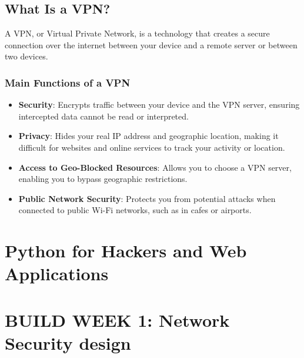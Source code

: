 \subsection{What Is a VPN?}

A VPN, or Virtual Private Network, is a technology that creates a secure connection over the internet between your device and a remote server or between two devices.

\subsubsection{Main Functions of a VPN}

\begin{itemize}
    \item \textbf{Security}: Encrypts traffic between your device and the VPN server, ensuring intercepted data cannot be read or interpreted.
    \item \textbf{Privacy}: Hides your real IP address and geographic location, making it difficult for websites and online services to track your activity or location.
    \item \textbf{Access to Geo-Blocked Resources}: Allows you to choose a VPN server, enabling you to bypass geographic restrictions.
    \item \textbf{Public Network Security}: Protects you from potential attacks when connected to public Wi-Fi networks, such as in cafes or airports.
\end{itemize}


\section{Python for Hackers and Web Applications}

\section{BUILD WEEK 1: Network Security design}
